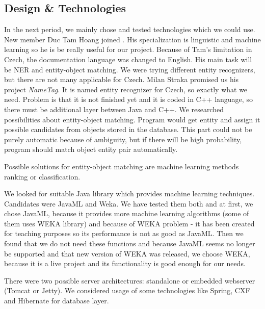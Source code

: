 \subsection{Design \& Technologies}
In the next period, we mainly chose and tested technologies which we could use.
New member Duc Tam Hoang joined \textan{}. His specialization is linguistic and
machine learning so he is be really useful for our project. Because of Tam's
limitation in Czech, the documentation language was changed to English. His main
task will be NER and entity-object matching. We were trying different
entity recognizers, but there are not many applicable for Czech. Milan Straka
promised us his project \emph{NameTag}. It is named entity recognizer for Czech,
so exactly what we need. Problem is that it is not finished yet and it is coded
in C++ language, so there must be additional layer between Java and C++.
We researched possibilities about entity-object matching. Program would get
entity and assign it possible candidates from objects stored in the database.
This part could not be purely automatic because of ambiguity, but if there will
be high probability, program should match object entity pair automatically.

Possible solutions for entity-object matching are machine learning methods
ranking or classification.

We looked for suitable Java library which provides machine learning techniques.
Candidates were JavaML and Weka. We have tested them both and at first, we chose
JavaML, because it provides more machine learning algorithms (some of them uses
WEKA library) and because of WEKA problem - it has been created for teaching
purposes so its performance is not as good as JavaML. Then we found that we
do not need these functions and because JavaML seems no longer be supported and
that new version of WEKA was released, we choose WEKA, because it is a live
project and its functionality is good enough for our needs.

There were two possible server architectures: standalone or embedded webserver
(Tomcat or Jetty). We considered usage of some technologies like Spring, CXF and
Hibernate for database layer.

